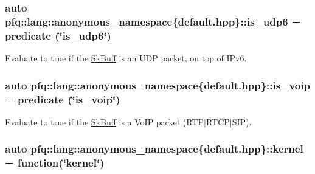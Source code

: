 \subsubsection[{\texorpdfstring{is\+\_\+udp6}{is_udp6}}]{\setlength{\rightskip}{0pt plus 5cm}auto pfq\+::lang\+::anonymous\+\_\+namespace\{default.\+hpp\}\+::is\+\_\+udp6 = {\bf predicate} (\char`\"{}is\+\_\+udp6\char`\"{})}\hypertarget{namespacepfq_1_1lang_1_1anonymous__namespace_02default_8hpp_03_a8f3f79760f7be2ce30db5025bff887a6}{}\label{namespacepfq_1_1lang_1_1anonymous__namespace_02default_8hpp_03_a8f3f79760f7be2ce30db5025bff887a6}


Evaluate to {\ttfamily true} if the \hyperlink{structpfq_1_1lang_1_1SkBuff}{Sk\+Buff} is an U\+DP packet, on top of I\+Pv6. 

\subsubsection[{\texorpdfstring{is\+\_\+voip}{is_voip}}]{\setlength{\rightskip}{0pt plus 5cm}auto pfq\+::lang\+::anonymous\+\_\+namespace\{default.\+hpp\}\+::is\+\_\+voip = {\bf predicate} (\char`\"{}is\+\_\+voip\char`\"{})}\hypertarget{namespacepfq_1_1lang_1_1anonymous__namespace_02default_8hpp_03_a79aa9beec811d735d03b40f85b4773c5}{}\label{namespacepfq_1_1lang_1_1anonymous__namespace_02default_8hpp_03_a79aa9beec811d735d03b40f85b4773c5}


Evaluate to {\ttfamily true} if the \hyperlink{structpfq_1_1lang_1_1SkBuff}{Sk\+Buff} is a Vo\+IP packet (R\+T\+P$\vert$\+R\+T\+C\+P$\vert$\+S\+IP). 

\subsubsection[{\texorpdfstring{kernel}{kernel}}]{\setlength{\rightskip}{0pt plus 5cm}auto pfq\+::lang\+::anonymous\+\_\+namespace\{default.\+hpp\}\+::kernel = {\bf function}(\char`\"{}kernel\char`\"{})}\hypertarget{namespacepfq_1_1lang_1_1anonymous__namespace_02default_8hpp_03_a93294225145f96c6aa6cf0cedfa19103}{}\label{namespacepfq_1_1lang_1_1anonymous__namespace_02default_8hpp_03_a93294225145f96c6aa6cf0cedfa19103}


